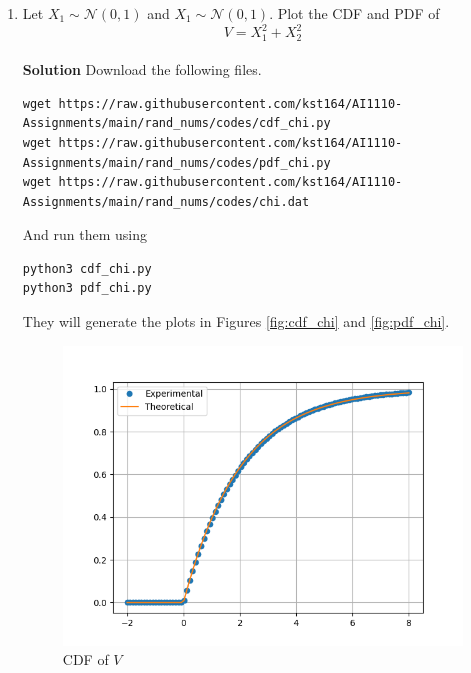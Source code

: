 \documentclass[journal, 12pt, twocolumn]{IEEEtran}
\begin{document}
\begin{enumerate}[label=\arabic{section}.\arabic*]
    \item
        Let $X_1 \sim \mathcal{N}(0, 1)$ and $X_1 \sim \mathcal{N}(0, 1)$. Plot the CDF and PDF of
        \begin{equation}
            V = X_1^2 + X_2^2
        \end{equation}
        \\
        \textbf{Solution} Download the following files.
        \begin{lstlisting}
wget https://raw.githubusercontent.com/kst164/AI1110-Assignments/main/rand_nums/codes/cdf_chi.py
wget https://raw.githubusercontent.com/kst164/AI1110-Assignments/main/rand_nums/codes/pdf_chi.py
wget https://raw.githubusercontent.com/kst164/AI1110-Assignments/main/rand_nums/codes/chi.dat
        \end{lstlisting}
        And run them using
        \begin{lstlisting}
python3 cdf_chi.py
python3 pdf_chi.py
        \end{lstlisting}
        They will generate the plots in Figures \eqref{fig:cdf_chi} and \eqref{fig:pdf_chi}.
        \begin{figure}[!ht]
            \includegraphics[width=\columnwidth]{figs/cdf_chi.png}
            \caption{CDF of $V$}
            \label{fig:cdf_chi}
        \end{figure}
        \begin{figure}[!ht]

\end{figure}
\end{enumerate}
\end{document}

